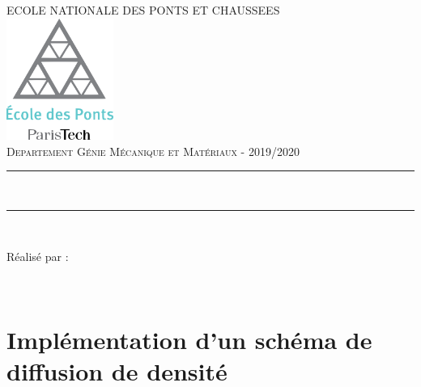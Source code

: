 \documentclass{article}
\begin{document}
\lstset{language=matlab}   

\begin{titlepage}
	\thispagestyle{empty}
	\newcommand{\HRule}{\rule{\linewidth}{0.5mm}}
	\center
	\textsc{\large ECOLE NATIONALE DES PONTS ET CHAUSSEES}\\[.7cm]
	\includegraphics[width=35mm]{img/ENPC_logo.png}\\[.5cm]
	\textsc{\large Departement Génie Mécanique et Matériaux - 2019/2020}\\[0.5cm]
	
	\vspace{2cm}
	
	\HRule \\[0.4cm]
	{\LARGE {\selectfont {SPH : Projet}}
    \vspace{0.4cm}
	\HRule \\[.5cm]

\vspace{3cm}

\large Réalisé par : 

\vspace{0.5cm}

{}
\\
\vspace{1cm}


}
\end{titlepage}


\newpage
\section{Implémentation d'un schéma de diffusion de densité}
\end{document}
